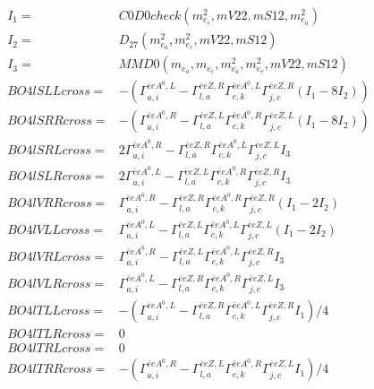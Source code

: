 \documentclass[A4,landscape]{article}
\begin{document}
\begin{align} 
I_1 = & C0D0check(m^2_{e_{{c}}}, mV22, mS12, m^2_{e_{{a}}}) \\ 
I_2 = & D_{27}(m^2_{e_{{a}}}, m^2_{e_{{c}}}, mV22, mS12) \\ 
I_3 = & MMD0(m_{e_{{a}}}, m_{e_{{c}}}, m^2_{e_{{a}}}, m^2_{e_{{c}}}, mV22, mS12) \\ 
  BO4lSLLcross= & -( \Gamma^{\bar{e}e A^0 ,L}_{a, i} - \Gamma^{\bar{e}e Z ,R} _{l, a} \Gamma^{\bar{e}e A^0 ,L}_{c, k} \Gamma^{\bar{e}e Z ,R}_{j, c} (I_1 - 8 I_2)) \\ 
  BO4lSRRcross= & -( \Gamma^{\bar{e}e A^0 ,R}_{a, i} - \Gamma^{\bar{e}e Z ,L} _{l, a} \Gamma^{\bar{e}e A^0 ,R}_{c, k} \Gamma^{\bar{e}e Z ,L}_{j, c} (I_1 - 8 I_2)) \\ 
  BO4lSRLcross= & 2  \Gamma^{\bar{e}e A^0 ,R}_{a, i} - \Gamma^{\bar{e}e Z ,R} _{l, a} \Gamma^{\bar{e}e A^0 ,L}_{c, k} \Gamma^{\bar{e}e Z ,L}_{j, c} I_3 \\ 
  BO4lSLRcross= & 2  \Gamma^{\bar{e}e A^0 ,L}_{a, i} - \Gamma^{\bar{e}e Z ,L} _{l, a} \Gamma^{\bar{e}e A^0 ,R}_{c, k} \Gamma^{\bar{e}e Z ,R}_{j, c} I_3 \\ 
  BO4lVRRcross= &  \Gamma^{\bar{e}e A^0 ,R}_{a, i} - \Gamma^{\bar{e}e Z ,R} _{l, a} \Gamma^{\bar{e}e A^0 ,R}_{c, k} \Gamma^{\bar{e}e Z ,R}_{j, c} (I_1 - 2 I_2) \\ 
  BO4lVLLcross= &  \Gamma^{\bar{e}e A^0 ,L}_{a, i} - \Gamma^{\bar{e}e Z ,L} _{l, a} \Gamma^{\bar{e}e A^0 ,L}_{c, k} \Gamma^{\bar{e}e Z ,L}_{j, c} (I_1 - 2 I_2) \\ 
  BO4lVRLcross= &  \Gamma^{\bar{e}e A^0 ,R}_{a, i} - \Gamma^{\bar{e}e Z ,L} _{l, a} \Gamma^{\bar{e}e A^0 ,L}_{c, k} \Gamma^{\bar{e}e Z ,R}_{j, c} I_3 \\ 
  BO4lVLRcross= &  \Gamma^{\bar{e}e A^0 ,L}_{a, i} - \Gamma^{\bar{e}e Z ,R} _{l, a} \Gamma^{\bar{e}e A^0 ,R}_{c, k} \Gamma^{\bar{e}e Z ,L}_{j, c} I_3 \\ 
  BO4lTLLcross= & -( \Gamma^{\bar{e}e A^0 ,L}_{a, i} - \Gamma^{\bar{e}e Z ,R} _{l, a} \Gamma^{\bar{e}e A^0 ,L}_{c, k} \Gamma^{\bar{e}e Z ,R}_{j, c} I_1)/4 \\ 
  BO4lTLRcross= & 0 \\ 
  BO4lTRLcross= & 0 \\ 
  BO4lTRRcross= & -( \Gamma^{\bar{e}e A^0 ,R}_{a, i} - \Gamma^{\bar{e}e Z ,L} _{l, a} \Gamma^{\bar{e}e A^0 ,R}_{c, k} \Gamma^{\bar{e}e Z ,L}_{j, c} I_1)/4 \\ 
\end{align} 
\end{document}
